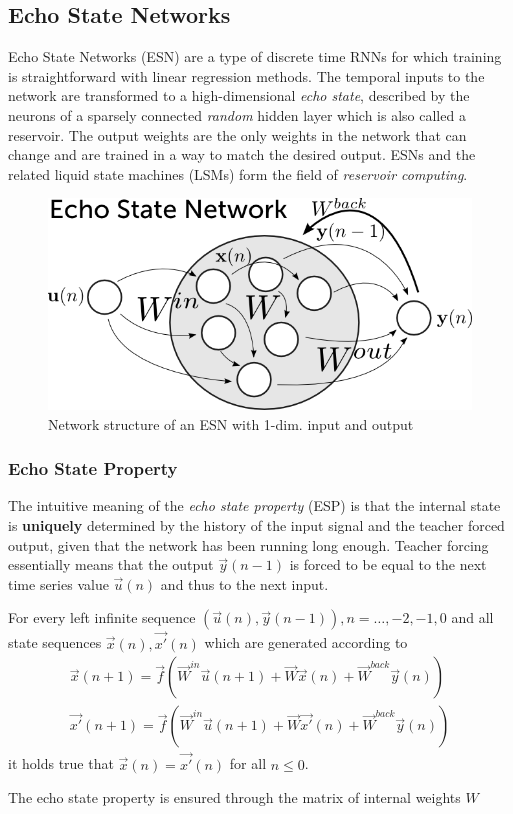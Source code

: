 \subsection*{Echo State Networks}
Echo State Networks (ESN) are a type of discrete time RNNs for which training is straightforward with linear regression methods.  The temporal inputs to the network are transformed to a high-dimensional \emph{echo state}, described by the neurons of a sparsely connected \emph{random} hidden layer which is also called a reservoir. The output weights are the only weights in the network that can change and are trained in a way to match the desired output. ESNs and the related liquid state machines (LSMs) form the field of \emph{reservoir computing}.

\begin{figure}
    \centering
    \includegraphics[width=.7\textwidth]{img/ESN_prezi.png}
    \caption{Network structure of an ESN with 1-dim. input and output}
\end{figure}

\subsubsection{Echo State Property}
The intuitive meaning of the \emph{echo state property} (ESP) is that the internal state is \textbf{uniquely} determined by the history of the input signal and the teacher forced output, given that the network has been running long enough. Teacher forcing essentially means that the output $\vec{y}(n-1)$ is forced to be equal to the next time series value $\vec{u}(n)$ and thus to the next input.
\begin{frm-def}
For every left infinite sequence $(\vec{u}(n),\vec{y}(n-1)),n=\dots,-2,-1,0$ and all state sequences $\vec{x}(n),\vec{x'}(n)$ which are generated according to
\begin{align*}	
	\vec{x}(n+1)=\vec{f}(\vec{W}^{in}\vec{u}(n+1)+\vec{W}\vec{x}(n)+\vec{W}^{back}\vec{y}(n))\\
	\vec{x'}(n+1)=\vec{f}(\vec{W}^{in}\vec{u}(n+1)+\vec{W}\vec{x'}(n)+\vec{W}^{back}\vec{y}(n))
\end{align*}
it holds true that $\vec{x}(n)=\vec{x'}(n)$ for all $n \leq 0$.
\end{frm-def}
The echo state property is ensured through the matrix of internal weights $W$


